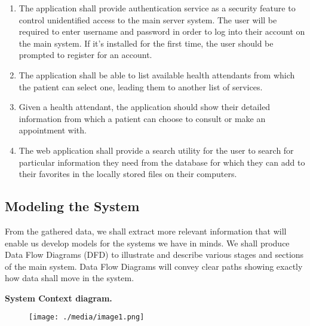 \documentclass[12pt]{article}
\begin{document}
\begin{enumerate}
	\item The application shall provide authentication service as a security feature to control unidentified access to the main server system. The user will be required to enter username and password in order to log into their account on the main system. If it’s installed for the first time, the user should be prompted to register for an account.\par

	\item The application shall be able to list available health attendants from which the patient can select one, leading them to another list of services. \par

	\item Given a health attendant, the application should show their detailed information from which a patient can choose to consult or make an appointment with. \par

	\item The web application shall provide a search utility for the user to search for particular information they need from the database for which they can add to their favorites in the locally stored files on their computers.
\end{enumerate}\par


\vspace{\baselineskip}
\subsection{Modeling the System}
From the gathered data, we shall extract more relevant information that will enable us develop models for the systems we have in minds. We shall produce Data Flow Diagrams (DFD) to illustrate and describe various stages and sections of the main system. Data Flow Diagrams will convey clear paths showing exactly how data shall move in the system. \par

\textbf{System Context diagram.}\par


\vspace{\baselineskip}



\begin{figure}[H]
	\begin{Center}
		\texttt{[image: ./media/image1.png]}
	\end{Center}
\end{figure}
\end{document}

